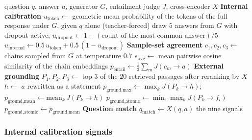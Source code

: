 \begin{algorithm}[!htbp]
\caption[Verifier ensemble (Stage~5).]{Verifier ensemble (Stage~5).}
\label{alg:verifier}
\begin{algorithmic}[1]
\Require question $q$, answer $a$, generator $G$, entailment judge $J$, cross-encoder $X$
\Statex \textbf{Internal calibration}
\State $u_{\text{token}} \gets$ geometric mean probability of the tokens of the full response under $G$, given $q$ alone (teacher-forced)
\State draw $5$ answers from $G$ with dropout active; $u_{\text{dropout}} \gets 1 - (\text{count of the most common answer})/5$
\State $u_{\text{internal}} \gets 0.5\,u_{\text{token}} + 0.5\,(1-u_{\text{dropout}})$
\Statex \textbf{Sample-set agreement}
\State $c_{1}, c_{2}, c_{3} \gets$ chains sampled from $G$ at temperature $0.7$
\State $s_{\text{avg}} \gets$ mean pairwise cosine similarity of the chain embeddings
\State $p_{\text{entail}} \gets \tfrac{1}{3}\sum_{m} J(c_{m} \to a)$
\Statex \textbf{External grounding}
\State $P_{1}, P_{2}, P_{3} \gets$ top $3$ of the $20$ retrieved passages after reranking by $X$
\State $h \gets$ $a$ rewritten as a statement 
\State $p_{\text{ground,max}} \gets \max_{k} J(P_{k} \to h)$; \quad $p_{\text{ground,mean}} \gets \mathrm{mean}_{k}\, J(P_{k} \to h)$
    \State $p_{\text{ground,atomic}} \gets \min_{i} \max_{k} J(P_{k} \to f_{i})$
\Else
    \State $p_{\text{ground,atomic}} \gets p_{\text{ground,mean}}$
\EndIf
\Statex \textbf{Question match}
\State $q_{\text{match}} \gets X(q, a)$ 
\State \Return the nine signals
\end{algorithmic}
\end{algorithm}

\subsubsection{Internal calibration signals}
\label{sec:verifier-internal}

